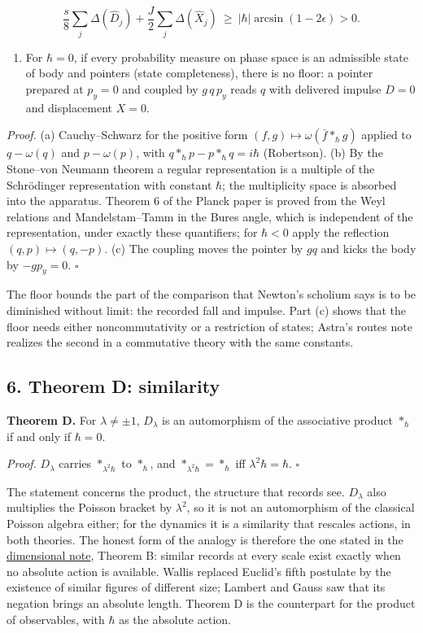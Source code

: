 \documentclass[11pt,a4paper]{article}
\newcommand{\tightlist}{\setlength{\itemsep}{0pt}\setlength{\parskip}{0pt}}
\begin{document}
\[\frac s8\sum_j\Delta(\hat D_j)+\frac J2\sum_j\Delta(\hat X_j)\ \ge\
|\hbar|\arcsin(1-2\epsilon)>0 .\]

\begin{enumerate}
\def\labelenumi{(\alph{enumi})}
\setcounter{enumi}{2}
\tightlist
\item
  For \(\hbar=0\), if every probability measure on phase space is an
  admissible state of body and pointers (state completeness), there is
  no floor: a pointer prepared at \(p_y=0\) and coupled by \(g\,q\,p_y\)
  reads \(q\) with delivered impulse \(D=0\) and displacement \(X=0\).
\end{enumerate}

\emph{Proof.} (a) Cauchy--Schwarz for the positive form
\((f,g)\mapsto\omega(\bar f*_\hbar g)\) applied to \(q-\omega(q)\) and
\(p-\omega(p)\), with \(q*_\hbar p-p*_\hbar q=i\hbar\) (Robertson). (b)
By the Stone--von Neumann theorem a regular representation is a multiple
of the Schrödinger representation with constant \(\hbar\); the
multiplicity space is absorbed into the apparatus. Theorem 6 of the
Planck paper is proved from the Weyl relations and Mandelstam--Tamm in
the Bures angle, which is independent of the representation, under
exactly these quantifiers; for \(\hbar<0\) apply the reflection
\((q,p)\mapsto(q,-p)\). (c) The coupling moves the pointer by \(gq\) and
kicks the body by \(-gp_y=0\). \(\square\)

The floor bounds the part of the comparison that Newton's scholium says
is to be diminished without limit: the recorded fall and impulse. Part
(c) shows that the floor needs either noncommutativity or a restriction
of states; Astra's routes note realizes the second in a commutative
theory with the same constants.

\hypertarget{theorem-d-similarity}{%
\subsection{6. Theorem D: similarity}\label{theorem-d-similarity}}

\textbf{Theorem D.} For \(\lambda\ne\pm1\), \(D_\lambda\) is an
automorphism of the associative product \(*_\hbar\) if and only if
\(\hbar=0\).

\emph{Proof.} \(D_\lambda\) carries \(*_{\lambda^2\hbar}\) to
\(*_\hbar\), and \(*_{\lambda^2\hbar}=*_\hbar\) iff
\(\lambda^2\hbar=\hbar\). \(\square\)

The statement concerns the product, the structure that records see.
\(D_\lambda\) also multiplies the Poisson bracket by \(\lambda^2\), so
it is not an automorphism of the classical Poisson algebra either; for
the dynamics it is a similarity that rescales actions, in both theories.
The honest form of the analogy is therefore the one stated in the
\href{action-unit-dimensional-selection.md}{dimensional note}, Theorem
B: similar records at every scale exist exactly when no absolute action
is available. Wallis replaced Euclid's fifth postulate by the existence
of similar figures of different size; Lambert and Gauss saw that its
negation brings an absolute length. Theorem D is the counterpart for the
product of observables, with \(\hbar\) as the absolute action.
\end{document}
